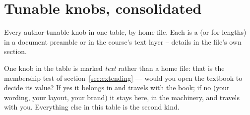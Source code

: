 \section{Tunable knobs, consolidated}\label{sec:ref-knobs}

Every author-tunable knob in one table, by home file. Each is a
 (or  for lengths) in a document preamble
or in the course's text layer -- details in the file's own section.

One knob in the table is marked \emph{text} rather than a home file:
that is the membership test of section~\ref{sec:extending} --- would you
open the textbook to decide its value? If yes it belongs in
 and travels with the book; if no (your
wording, your layout, your brand) it stays here, in the machinery, and
travels with you. Everything else in this table is the second kind.

